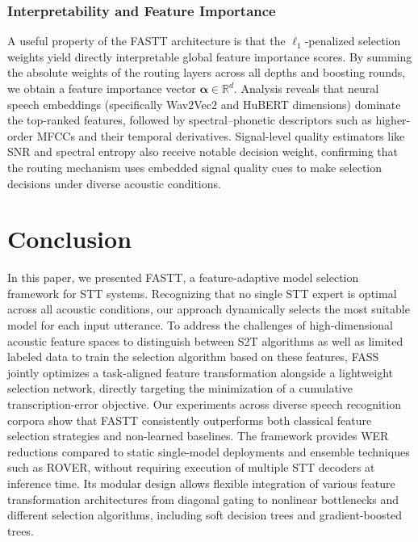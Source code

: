 \documentclass[journal]{IEEEtran}
\begin{document}
    \subsubsection{Interpretability and Feature Importance}
    A useful property of the FASTT architecture is that the $\ell_{1}$-penalized
    selection weights yield directly interpretable global feature importance scores.
    By summing the absolute weights of the routing layers across all depths and
    boosting rounds, we obtain a feature importance vector $\boldsymbol{\alpha}\in
    \mathbb{R}^{d}$. Analysis reveals that neural speech embeddings (specifically
    Wav2Vec2 and HuBERT dimensions) dominate the top-ranked features, followed by
    spectral--phonetic descriptors such as higher-order MFCCs and their temporal
    derivatives. Signal-level quality estimators like SNR and spectral entropy also
    receive notable decision weight, confirming that the routing mechanism uses
    embedded signal quality cues to make selection decisions under diverse
    acoustic conditions.
    \section{Conclusion}
    \label{sec:conclusion}

    In this paper, we presented FASTT, a feature-adaptive model selection
    framework for STT systems. Recognizing that no single STT expert is optimal across all acoustic conditions, our approach dynamically selects the most suitable model for each input utterance. To address the challenges of high-dimensional acoustic feature spaces to distinguish between S2T algorithms as well as limited labeled data to train the selection algorithm based on these features, FASS jointly optimizes a task-aligned feature transformation alongside a lightweight
    selection network, directly targeting the minimization of a cumulative transcription-error objective. Our experiments across diverse speech recognition corpora show that FASTT consistently outperforms both classical feature selection strategies and non-learned baselines. The framework provides WER reductions compared to static single-model deployments and ensemble techniques such as ROVER, without requiring execution
    of multiple STT decoders at inference time. Its modular design allows
    flexible integration of various feature transformation architectures from diagonal gating to nonlinear bottlenecks and different selection algorithms, including soft decision trees and gradient-boosted trees. 
\end{document}
